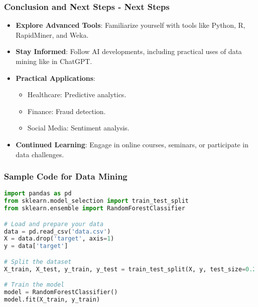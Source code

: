 \documentclass[aspectratio=169]{beamer}
\begin{document}
\begin{frame}[fragile]
    \frametitle{Conclusion and Next Steps - Next Steps}
    \begin{itemize}
        \item \textbf{Explore Advanced Tools}: Familiarize yourself with tools like Python, R, RapidMiner, and Weka.
        \item \textbf{Stay Informed}: Follow AI developments, including practical uses of data mining like in ChatGPT.
        \item \textbf{Practical Applications}:
            \begin{itemize}
                \item Healthcare: Predictive analytics.
                \item Finance: Fraud detection.
                \item Social Media: Sentiment analysis.
            \end{itemize}
        \item \textbf{Continued Learning}: Engage in online courses, seminars, or participate in data challenges.
    \end{itemize}
\end{frame}

\begin{frame}
    \frametitle{Sample Code for Data Mining}
    \begin{lstlisting}[language=Python]
import pandas as pd
from sklearn.model_selection import train_test_split
from sklearn.ensemble import RandomForestClassifier

# Load and prepare your data
data = pd.read_csv('data.csv')
X = data.drop('target', axis=1)
y = data['target']

# Split the dataset
X_train, X_test, y_train, y_test = train_test_split(X, y, test_size=0.2, random_state=42)

# Train the model
model = RandomForestClassifier()
model.fit(X_train, y_train)
    \end{lstlisting}
\end{frame}
\end{document}
